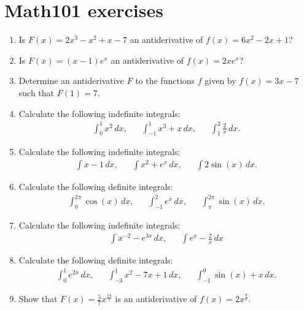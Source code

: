 \newpage
\section{Math101 exercises}

\begin{enumerate}
	\item Is $F(x)=2x^3-x^2+x-7$ an antiderivative of $f(x)=6x^2-2x+1$?
	
	
	\item Is $F(x)=(x-1)e^x$ an antiderivative of $f(x)=2xe^x$?
	
	\item Determine an antiderivative $F$ to the functions $f$ given by $f(x)=3x-7$ such that $F(1)=7$.
	
	\item Calculate the following indefinite integrals:
	\begin{align*}
	\int_0^1 x^2 \, dx,&& \int_{-1}^1 x^3+x \, dx, && \int_1^2 \frac{2}{x}\, dx. 
	\end{align*}
		
	
	\item Calculate the following indefinite integrals:
	\begin{align*}
	\int x-1 \, dx, && \int x^2+e^x \, dx,&& \int 2\sin(x)\, dx.
	\end{align*}
	
	\item Calculate the following definite integrals:
	\begin{align*}
	\int_{0}^{2\pi} \cos(x) \, dx,&& \int_{-1}^2 e^x \, dx, && \int_{\pi}^{2\pi} \sin(x) \, dx.
	\end{align*}
	
	\item Calculate the following indefinite integrals:
	\begin{align*}
	\int x^{-2}-e^{3x} \,dx ,&& \int e^{x}-\frac{2}{x}\, dx
	\end{align*}
	
	
	\item Calculate the following definite integrals:
	\begin{align*}
	\int_0^1 e^{2x}\, dx,&& \int_{-3}^1 x^2 -7x+1 \, dx,&& \int_{-1}^0 \sin(x)+x\, dx.
	\end{align*}
	
	
	
	
	
	

	
	\item Show that $F(x)=\frac{5}{7}x^{\frac{14}{5}}$ is an antiderivative of $f(x)=2x^{\frac{9}{5}}$.
	

\end{enumerate}
